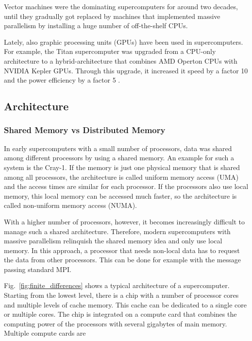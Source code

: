 Vector machines were the dominating supercomputers for around two decades, until they gradually got replaced by machines that implemented massive parallelism by installing a huge number of off-the-shelf CPUs. 

Lately, also graphic processing units (GPUs) have been used in supercomputers. For example, the Titan supercomputer was upgraded from a CPU-only architecture to a hybrid-architecture that combines AMD Operton CPUs with NVIDIA Kepler GPUs. Through this upgrade, it increased it speed by a factor 10 and the power efficiency by a factor 5 \cite{titan}.


\subsection{Architecture}

\subsubsection{Shared Memory vs Distributed Memory}

In early supercomputers with a small number of processors, data was shared among different processors by using a shared memory. An example for such a system is the Cray-1. If the memory is just one physical memory that is shared among all processors, the architecture is called uniform memory access (UMA) and the access times are similar for each processor. If the processors also use local memory, this local memory can be accessed much faster, so the architecture is called non-uniform memory access (NUMA). 

With a higher number of processors, however, it becomes increasingly difficult to manage such a shared architecture. Therefore, modern supercomputers with massive parallelism relinquish the shared memory idea and only use local memory. In this approach, a processor that needs non-local data has to request the data from other processors. This can be done for example with the message passing standard MPI. 

Fig.~\ref{fig:finite_differences} shows a typical architecture of a supercomputer. Starting from the lowest level, there is a chip with a number of processor cores and multiple levels of cache memory. This cache can be dedicated to a single core or multiple cores. The chip is integrated on a compute card that combines the computing power of the processors with several gigabytes of main memory. Multiple compute cards are 

